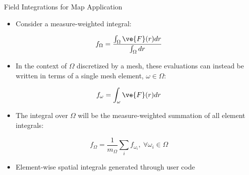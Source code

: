 \documentclass{beamer}
\begin{document}
\begin{frame}{Field Integrations for Map Application}

  \begin{itemize}
  \item Consider a measure-weighted integral:
  \end{itemize}

  \[
  f_{\Omega} = \frac{\int_{\Omega} \ve{F}(r) dr}{\int_{\Omega} dr}
  \]

  \begin{itemize}
  \item In the context of $\Omega$ discretized by a mesh, these
    evaluations can instead be written in terms of a single mesh
    element, $\omega \in \Omega$:
  \end{itemize}

  \[
  f_{\omega} = \int_{\omega} \ve{F}(r) dr
  \]

  \begin{itemize}
  \item The integral over $\Omega$ will be the measure-weighted
    summation of all element integrals:
  \end{itemize}

  \[
    f_{\Omega} = \frac{1}{m_{\Omega}} \sum_i f_{{\omega}_i},\ \forall
    \omega_i \in \Omega
  \]

  \begin{itemize}
  \item Element-wise spatial integrals generated through user code
  \end{itemize}
\end{frame}
\end{document}
